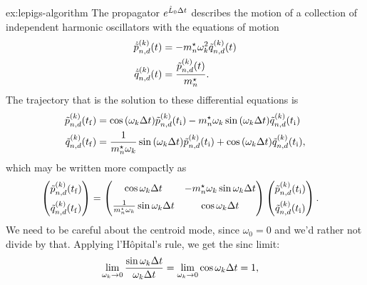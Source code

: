 \begin{DefAnswer}{ex:lepigs-algorithm}
	The propagator $e^{\hat{L}_0 \Delta t}$ describes the motion of a collection of independent harmonic oscillators with the equations of motion
	\begin{subequations}
	\begin{align}
		\dot{\tilde{p}}_{n,d}^{(k)}(t)
		&= -{m}^\star_n \omega_k^2 \tilde{q}_{n,d}^{(k)}(t) \\
		\dot{\tilde{q}}_{n,d}^{(k)}(t)
		&= \frac{\tilde{p}_{n,d}^{(k)}(t)}{{m}^\star_n}.
	\end{align}
	\end{subequations}
	The trajectory that is the solution to these differential equations is~\cite[31]{zwanzig2001nonequilibrium}
	\begin{subequations} \label{eq:harmonic-oscillator-trajectory-exact}
	\begin{align}
		\tilde{p}_{n,d}^{(k)}(t_\mathrm{f})
		&= \cos{(\omega_k \Delta t)} \tilde{p}_{n,d}^{(k)}(t_\mathrm{i}) - {m}^\star_n \omega_k \sin{(\omega_k \Delta t)} \tilde{q}_{n,d}^{(k)}(t_\mathrm{i}) \\
		\tilde{q}_{n,d}^{(k)}(t_\mathrm{f})
		&= \frac{1}{{m}^\star_n \omega_k} \sin{(\omega_k \Delta t)} \tilde{p}_{n,d}^{(k)}(t_\mathrm{i}) + \cos{(\omega_k \Delta t)} \tilde{q}_{n,d}^{(k)}(t_\mathrm{i}),
	\end{align}
	\end{subequations}
	which may be written more compactly as
	\begin{align}
		\begin{pmatrix}
			\tilde{p}_{n,d}^{(k)}(t_\mathrm{f}) \\[2 mm]
			\tilde{q}_{n,d}^{(k)}(t_\mathrm{f})
		\end{pmatrix}
		&= \begin{pmatrix}
				\cos{\omega_k \Delta t} & -{m}^\star_n \omega_k \sin{\omega_k \Delta t} \\[2 mm]
				\frac{1}{{m}^\star_n \omega_k} \sin{\omega_k \Delta t} & \cos{\omega_k \Delta t}
			\end{pmatrix}
			\begin{pmatrix}
				\tilde{p}_{n,d}^{(k)}(t_\mathrm{i}) \\[2 mm]
				\tilde{q}_{n,d}^{(k)}(t_\mathrm{i})
			\end{pmatrix}.
	\end{align}
	We need to be careful about the centroid mode, since $\omega_0 = 0$ and we'd rather not divide by that.
	Applying l'Hôpital's rule, we get the sinc limit:
	\begin{align}
		\lim_{\omega_k \to 0} \frac{\sin{\omega_k \Delta t}}{\omega_k \Delta t}
		&= \lim_{\omega_k \to 0} \cos{\omega_k \Delta t}
		= 1,
	\end{align}

\end{DefAnswer}
